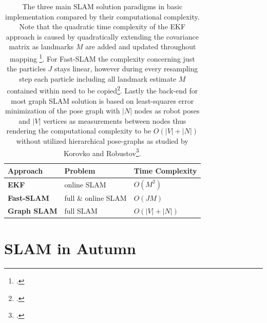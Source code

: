 \begin{table}[]
	\centering
	\begin{tabular}{|l|l|l|}
		\hline
		\textbf{Approach}   & \textbf{Problem}    & \textbf{Time Complexity} \\ \hline
		\textbf{EKF}        & online SLAM         & $O(M^{2})$               \\ \hline
		\textbf{Fast-SLAM}  & full \& online SLAM & $O(J M)$                 \\ \hline
		\textbf{Graph SLAM} & full  SLAM          & $O(|V| + |N|)$           \\ \hline
	\end{tabular}
	\caption{The three main SLAM solution paradigms in basic implementation compared by their computational complexity. Note that the quadratic time complexity of the EKF approach is caused by quadratically extending the covariance matrix as landmarks $M$ are added and updated throughout mapping \footcite{durrantSlam2006}.
	For Fast-SLAM the complexity concerning just the particles $J$ stays linear, however during every resampling step each particle including all landmark estimate $M$ contained within need to be copied\footcite{montemerlo2002fastslam}.
	Lastly the back-end for most graph SLAM solution is based on least-squares error minimization of the pose graph with $|N|$ nodes as robot poses and $|V|$ vertices as measurements between nodes thus rendering the computational complexity to be  $O(|V| + |N|)$ without utilized hierarchical pose-graphs as studied by Korovko and Robustov\footcite{korovko2021partial}. 
}
	\label{tab:slamComparison}
\end{table}

\section{SLAM in Autumn}

